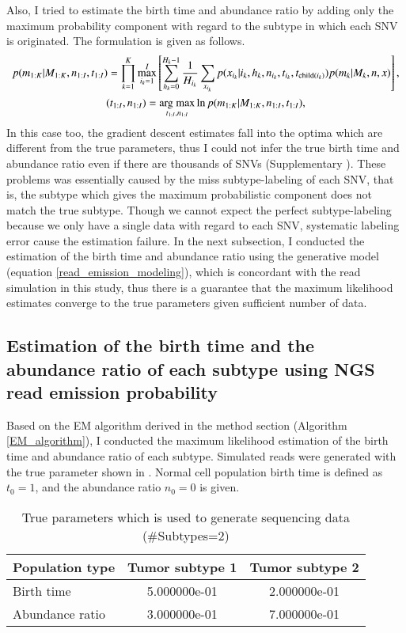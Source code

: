 \documentclass{article}
\begin{document}
Also, I tried to estimate the birth time and abundance ratio by adding only the maximum probability component with regard to the subtype in which each SNV is originated.
The formulation is given as follows.
\begin{gather}
 p(m_{1:K}|M_{1:K}, n_{1:I}, t_{1:I}) = \prod_{k=1}^{K} \max_{i_k=1}^{I} \left[\sum_{h_k=0}^{H_k-1} \frac{1}{H_{i_k}} \sum_{x_{i_k}} p(x_{i_k} | i_k, h_k, n_{i_k}, t_{i_k}, t_{\mathrm{child}(i_k)}) p (m_k | M_k, n, x)\right],\label{eq: binom_subtype_ungiven}\\
 (t_{1:I}, n_{1:I}) = \mathop{\rm arg~max}\limits_{t_{1:I}, n_{1:I}} \ln p(m_{1:K} | M_{1:K}, n_{1:I}, t_{1:I}),
\end{gather}
In this case too, the gradient descent estimates fall into the optima which are different from the true parameters, thus I could not infer the true birth time and abundance ratio even if there are thousands of SNVs (Supplementary ).
These problems was essentially caused by the miss subtype-labeling of each SNV, that is, the subtype which gives the maximum probabilistic component does not match the true subtype.
Though we cannot expect the perfect subtype-labeling because we only have a single data with regard to each SNV, systematic labeling error cause the estimation failure.
In the next subsection, I conducted the estimation of the birth time and abundance ratio using the generative model (equation \eqref{read_emission_modeling}), which is concordant with the read simulation in this study, thus there is a guarantee that the maximum likelihood estimates converge to the true parameters given sufficient number of data.

\subsection{Estimation of the birth time and the abundance ratio of each subtype using NGS read emission probability}
Based on the EM algorithm derived in the method section (Algorithm \ref{EM_algorithm}), I conducted the maximum likelihood estimation of the birth time and abundance ratio of each subtype.
Simulated reads were generated with the true parameter shown in . Normal cell population birth time is defined as $t_{0}=1$, and the abundance ratio $n_{0} = 0$ is given.

\begin{table}[H]
\begin{center}
 \caption{True parameters which is used to generate sequencing data (\#Subtypes=2)}
 \label{tab: true_parameters_0.5_0.4_3}
  \begin{tabular}[t]{lcc}\toprule
  Population type & Tumor subtype 1 & Tumor subtype 2\\\midrule
   Birth time & 5.000000e-01 & 2.000000e-01\\
   Abundance ratio & 3.000000e-01 & 7.000000e-01\\\bottomrule
 \end{tabular}
\end{center}
\end{table}
\end{document}
